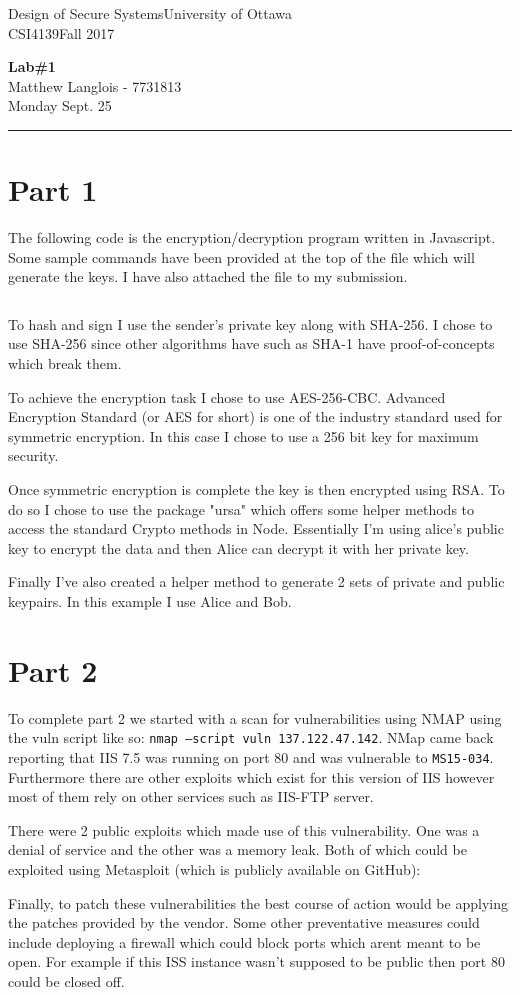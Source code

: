 \documentclass[fleqn, 12pt]{article}
\newcommand{\university}{University of Ottawa}
\newcommand{\name}{Matthew Langlois}
\newcommand{\studentNumber}{7731813}
\newcommand{\semester}{Fall 2017}
\newcommand{\assignmentType}{Lab}
\newcommand{\assignemntNumber}{1}
\newcommand{\dueDate}{Monday Sept. 25}
\newcommand{\courseCode}{CSI4139}
\newcommand{\courseTitle}{Design of Secure Systems}
\newcommand{\code}[1]{\colorbox{codegray}{\texttt{#1}}}
\newcommand{\codefile}{\inputminted}
\newcommand{\makeheader}{
    \noindent
    \courseTitle \hfill \university\\
    \courseCode \hfill \semester
    \begin{center}
        \textbf{\assignmentType \#\assignemntNumber}\\
        \name \hspace{1pt} - \studentNumber\\
        \dueDate\\
    \end{center}
    \vspace{6pt}
    \hrule
}
\begin{document}
\thispagestyle{firstpage}
\makeheader

\section*{Part 1}

The following code is the encryption/decryption program written in Javascript. Some sample commands have been provided at the top of the file which will generate the keys. I have also attached the file to my submission.

\codefile{javascript}{"Part 1/lab 1.js"}

To hash and sign I use the sender's private key along with SHA-256. I chose to use SHA-256 since other algorithms have such as SHA-1 have proof-of-concepts which break them.

To achieve the encryption task I chose to use AES-256-CBC. Advanced Encryption Standard (or AES for short) is one of the industry standard used for symmetric encryption. In this case I chose to use a 256 bit key for maximum security.

Once symmetric encryption is complete the key is then encrypted using RSA. To do so I chose to use the package "ursa" which offers some helper methods to access the standard Crypto methods in Node. Essentially I'm using alice's public key to encrypt the data and then Alice can decrypt it with her private key.


Finally I've also created a helper method to generate 2 sets of private and public keypairs. In this example I use Alice and Bob.

\section*{Part 2}

To complete part 2 we started with a scan for vulnerabilities using NMAP using the vuln script like so: \code{nmap --script vuln 137.122.47.142}. NMap came back reporting that IIS 7.5 was running on port 80 and was vulnerable to \code{MS15-034}. Furthermore there are other exploits which exist for this version of IIS however most of them rely on other services such as IIS-FTP server.

There were 2 public exploits which made use of this vulnerability. One was a denial of service and the other was a memory leak. Both of which could be exploited using Metasploit (which is publicly available on GitHub):


Finally, to patch these vulnerabilities the best course of action would be applying the patches provided by the vendor. Some other preventative measures could include deploying a firewall which could block ports which arent meant to be open. For example if this ISS instance wasn't supposed to be public then port 80 could be closed off.
\end{document}
